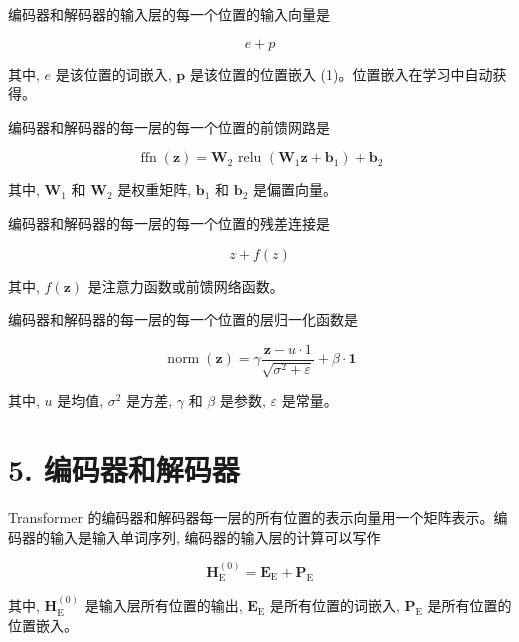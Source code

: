\documentclass[10pt]{article}
\begin{document}
编码器和解码器的输入层的每一个位置的输入向量是


\begin{equation*}
e+p \tag{26.27}
\end{equation*}


其中, $e$ 是该位置的词嵌入, $\boldsymbol{p}$ 是该位置的位置嵌入 (1)。位置嵌入在学习中自动获得。

编码器和解码器的每一层的每一个位置的前馈网路是


\begin{equation*}
\operatorname{ffn}(\boldsymbol{z})=\boldsymbol{W}_{2} \text { relu }\left(\boldsymbol{W}_{1} \boldsymbol{z}+\boldsymbol{b}_{1}\right)+\boldsymbol{b}_{2} \tag{26.28}
\end{equation*}


其中, $\boldsymbol{W}_{1}$ 和 $\boldsymbol{W}_{2}$ 是权重矩阵, $\boldsymbol{b}_{1}$ 和 $\boldsymbol{b}_{2}$ 是偏置向量。

编码器和解码器的每一层的每一个位置的残差连接是


\begin{equation*}
z+f(z) \tag{26.29}
\end{equation*}


其中, $f(\boldsymbol{z})$ 是注意力函数或前馈网络函数。

编码器和解码器的每一层的每一个位置的层归一化函数是


\begin{equation*}
\operatorname{norm}(\boldsymbol{z})=\gamma \frac{\boldsymbol{z}-u \cdot 1}{\sqrt{\sigma^{2}+\varepsilon}}+\beta \cdot \mathbf{1} \tag{26.30}
\end{equation*}


其中, $u$ 是均值, $\sigma^{2}$ 是方差, $\gamma$ 和 $\beta$ 是参数, $\varepsilon$ 是常量。

\section*{5. 编码器和解码器}
Transformer 的编码器和解码器每一层的所有位置的表示向量用一个矩阵表示。编码器的输入是输入单词序列, 编码器的输入层的计算可以写作


\begin{equation*}
\boldsymbol{H}_{\mathrm{E}}^{(0)}=\boldsymbol{E}_{\mathrm{E}}+\boldsymbol{P}_{\mathrm{E}} \tag{26.31}
\end{equation*}


其中, $\boldsymbol{H}_{\mathrm{E}}^{(0)}$ 是输入层所有位置的输出, $\boldsymbol{E}_{\mathrm{E}}$ 是所有位置的词嵌入, $\boldsymbol{P}_{\mathrm{E}}$ 是所有位置的位置嵌入。
\end{document}
